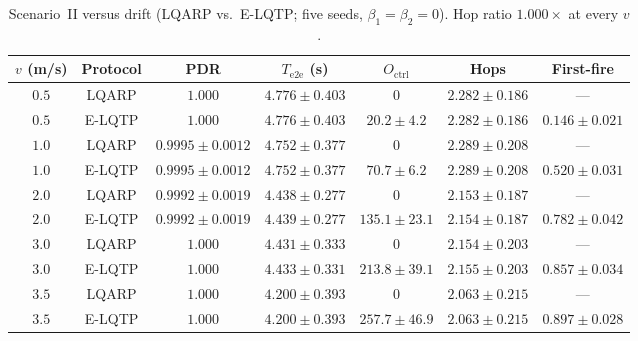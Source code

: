 
\begin{table}[!t]
\caption{Scenario~II versus drift (LQARP vs.\ E-LQTP; five seeds,
$\beta_1=\beta_2=0$). Hop ratio $1.000\times$ at every $v$.}
\label{tab:s2_drift}
\centering
\small
\begin{tabular}{ccccccc}
\hline
$v$ (m/s) & Protocol & PDR & $T_{\mathrm{e2e}}$ (s) & $O_{\mathrm{ctrl}}$
  & Hops & First-fire \\
\hline
$0.5$ & LQARP & $1.000$ & $4.776\pm 0.403$ & $0$ & $2.282\pm 0.186$ & --- \\
$0.5$ & E-LQTP & $1.000$ & $4.776\pm 0.403$ & $20.2\pm 4.2$ & $2.282\pm 0.186$ & $0.146\pm 0.021$ \\
$1.0$ & LQARP & $0.9995\pm 0.0012$ & $4.752\pm 0.377$ & $0$ & $2.289\pm 0.208$ & --- \\
$1.0$ & E-LQTP & $0.9995\pm 0.0012$ & $4.752\pm 0.377$ & $70.7\pm 6.2$ & $2.289\pm 0.208$ & $0.520\pm 0.031$ \\
$2.0$ & LQARP & $0.9992\pm 0.0019$ & $4.438\pm 0.277$ & $0$ & $2.153\pm 0.187$ & --- \\
$2.0$ & E-LQTP & $0.9992\pm 0.0019$ & $4.439\pm 0.277$ & $135.1\pm 23.1$ & $2.154\pm 0.187$ & $0.782\pm 0.042$ \\
$3.0$ & LQARP & $1.000$ & $4.431\pm 0.333$ & $0$ & $2.154\pm 0.203$ & --- \\
$3.0$ & E-LQTP & $1.000$ & $4.433\pm 0.331$ & $213.8\pm 39.1$ & $2.155\pm 0.203$ & $0.857\pm 0.034$ \\
$3.5$ & LQARP & $1.000$ & $4.200\pm 0.393$ & $0$ & $2.063\pm 0.215$ & --- \\
$3.5$ & E-LQTP & $1.000$ & $4.200\pm 0.393$ & $257.7\pm 46.9$ & $2.063\pm 0.215$ & $0.897\pm 0.028$ \\
\hline
\end{tabular}
\end{table}
